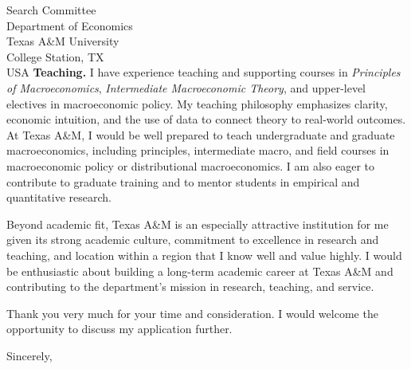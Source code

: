 \documentclass[11pt,letterpaper]{letter}
\begin{document}
\begin{letter}{Search Committee \\
Department of Economics \\
Texas A\&M University \\
College Station, TX \\ USA}
\textbf{Teaching.} I have experience teaching and supporting courses in \textit{Principles of Macroeconomics}, \textit{Intermediate Macroeconomic Theory}, and upper-level electives in macroeconomic policy. My teaching philosophy emphasizes clarity, economic intuition, and the use of data to connect theory to real-world outcomes. At Texas A\&M, I would be well prepared to teach undergraduate and graduate macroeconomics, including principles, intermediate macro, and field courses in macroeconomic policy or distributional macroeconomics. I am also eager to contribute to graduate training and to mentor students in empirical and quantitative research.

Beyond academic fit, Texas A\&M is an especially attractive institution for me given its strong academic culture, commitment to excellence in research and teaching, and location within a region that I know well and value highly. I would be enthusiastic about building a long-term academic career at Texas A\&M and contributing to the department’s mission in research, teaching, and service.

Thank you very much for your time and consideration. I would welcome the opportunity to discuss my application further.

\closing{Sincerely,}

\end{letter}
\end{document}
